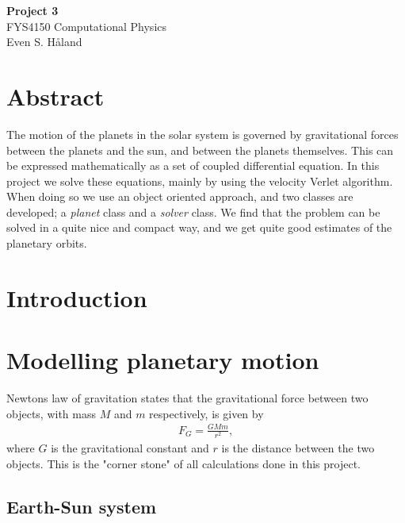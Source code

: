 \documentclass[12pt, a4paper]{article}
\begin{document}
\begin{titlepage}
\begin{center}
\vspace*{3cm}
\Huge
\textbf{Project 3} \\
\Large  
FYS4150 Computational Physics 
\vspace*{3cm} \\ 

Even S. Håland 
\vspace*{5cm} \\

\normalsize
\section*{Abstract}

The motion of the planets in the solar system is governed by gravitational forces between the planets 
and the sun, and between the planets themselves. This can be expressed mathematically as a set of coupled 
differential equation. In this project we solve these equations, mainly by using the velocity Verlet 
algorithm. When doing so we use an object oriented approach, and two classes are developed; a 
\textit{planet} class and a \textit{solver} class. We find that the problem can be solved in a quite nice 
and compact way, and we get quite good estimates of the planetary orbits.  

\end{center}
\end{titlepage}

\section{Introduction}

\section{Modelling planetary motion}

Newtons law of gravitation states that the gravitational force between two objects, with mass $M$ and $m$
respectively, is given by 
\begin{align}
F_G = \frac{GMm}{r^2}, 
\end{align}
where $G$ is the gravitational constant and $r$ is the distance between the two objects. This is 
the "corner stone" of all calculations done in this project. 

\subsection{Earth-Sun system}
\end{document}
